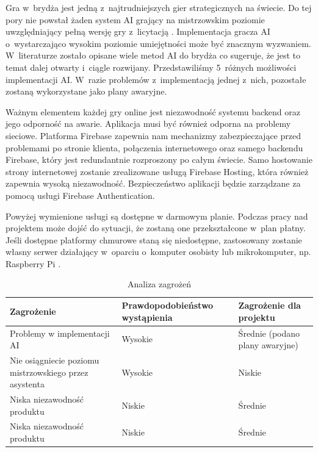 Gra w~brydża jest jedną z~najtrudniejszych gier strategicznych na świecie.
Do tej pory nie powstał żaden system AI grający na mistrzowskim poziomie
uwzględniający pełną wersję gry z~licytacją \cite{Bethe2021AdvancesIC}.
Implementacja gracza AI o~wystarczająco wysokim poziomie umiejętności może
być znacznym wyzwaniem. W~literaturze zostało opisane wiele metod AI do brydża
\cite{Zhang2019DesignAD,Zhang2022TheSO,Zhang2022AIEB,Ginsberg1999GIBST}
co sugeruje, że jest to temat dalej otwarty i~ciągle rozwijany.
Przedstawiliśmy 5~różnych możliwości implementacji AI.
W~razie problemów z~implementacją jednej z~nich, pozostałe
zostaną wykorzystane jako plany awaryjne.

Ważnym elementem każdej gry online jest niezawodność systemu
backend oraz jego odporność na awarie.
Aplikacja musi być również odporna na problemy sieciowe.
Platforma Firebase zapewnia nam mechanizmy zabezpieczające
przed problemami po stronie klienta, połączenia internetowego
oraz samego backendu Firebase, który jest redundantnie
rozproszony po całym świecie.
Samo hostowanie strony internetowej zostanie zrealizowane
usługą Firebase Hosting, która również zapewnia wysoką
niezawodność.
Bezpieczeństwo aplikacji będzie zarządzane za pomocą
usługi Firebase Authentication.

Powyżej wymienione usługi są dostępne w darmowym planie.
Podczas pracy nad projektem może dojść do sytuacji, że
zostaną one przekształcone w~plan płatny.
Jeśli dostępne platformy chmurowe staną się niedostępne,
zastosowany zostanie własny serwer działający
w~oparciu o~komputer osobisty lub mikrokomputer, np. Raspberry Pi \cite{RPi}.

\begin{table}[h]
    \centering
    \begin{tabularx}{\textwidth}{|p{5.5cm}|Y|Y|}
        \hline
        \textbf{Zagrożenie}                                    & \textbf{Prawdopodobieństwo wystąpienia} & \textbf{Zagrożenie dla projektu} \tabularnewline[0.2cm]
        \hline
        Problemy w implementacji AI                            & Wysokie                                 & Średnie (podano plany awaryjne)  \tabularnewline[0.2cm]
        Nie osiągniecie poziomu mistrzowskiego przez asystenta & Wysokie                                 & Niskie                           \tabularnewline[0.3cm]
        Niska niezawodność produktu                            & Niskie                                  & Średnie                          \tabularnewline[0.1cm]
        Niska niezawodność produktu                            & Niskie                                  & Średnie                          \tabularnewline[0.1cm]
        \hline
    \end{tabularx}
    \caption{Analiza zagrożeń}
    \label{tab:zagrozenia}
\end{table}

